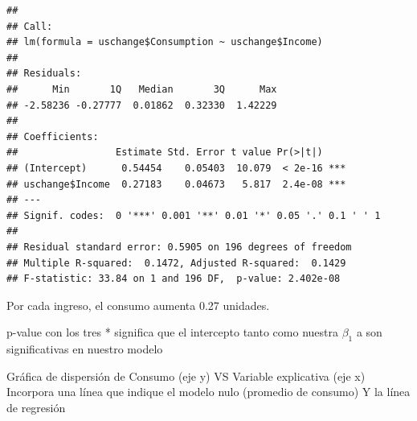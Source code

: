 \documentclass[
]{article}
\newenvironment{Shaded}{\begin{snugshade}}{\end{snugshade}}
\newcommand{\AttributeTok}[1]{\textcolor[rgb]{0.13,0.29,0.53}{#1}}
\newcommand{\CommentTok}[1]{\textcolor[rgb]{0.56,0.35,0.01}{\textit{#1}}}
\newcommand{\DecValTok}[1]{\textcolor[rgb]{0.00,0.00,0.81}{#1}}
\newcommand{\FloatTok}[1]{\textcolor[rgb]{0.00,0.00,0.81}{#1}}
\newcommand{\FunctionTok}[1]{\textcolor[rgb]{0.13,0.29,0.53}{\textbf{#1}}}
\newcommand{\NormalTok}[1]{#1}
\newcommand{\SpecialCharTok}[1]{\textcolor[rgb]{0.81,0.36,0.00}{\textbf{#1}}}
\newcommand{\StringTok}[1]{\textcolor[rgb]{0.31,0.60,0.02}{#1}}
\begin{document}
\begin{verbatim}
## 
## Call:
## lm(formula = uschange$Consumption ~ uschange$Income)
## 
## Residuals:
##      Min       1Q   Median       3Q      Max 
## -2.58236 -0.27777  0.01862  0.32330  1.42229 
## 
## Coefficients:
##                 Estimate Std. Error t value Pr(>|t|)    
## (Intercept)      0.54454    0.05403  10.079  < 2e-16 ***
## uschange$Income  0.27183    0.04673   5.817  2.4e-08 ***
## ---
## Signif. codes:  0 '***' 0.001 '**' 0.01 '*' 0.05 '.' 0.1 ' ' 1
## 
## Residual standard error: 0.5905 on 196 degrees of freedom
## Multiple R-squared:  0.1472, Adjusted R-squared:  0.1429 
## F-statistic: 33.84 on 1 and 196 DF,  p-value: 2.402e-08
\end{verbatim}

Por cada ingreso, el consumo aumenta 0.27 unidades.

p-value con los tres * significa que el intercepto tanto como nuestra
\(\beta_1\) a son significativas en nuestro modelo

Gráfica de dispersión de Consumo (eje y) VS Variable explicativa (eje x)
Incorpora una línea que indique el modelo nulo (promedio de consumo) Y
la línea de regresión

\begin{Shaded}
\end{Shaded}
\end{document}
